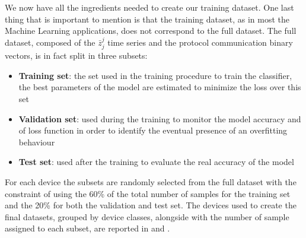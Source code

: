 We now have all the ingredients needed to create our training dataset. One last thing that is important to mention is that the training dataset, as in most the Machine Learning applications,
does not correspond to the full dataset. The full dataset, composed of the $\bar{z}_j^j$ time series and the protocol communication binary vectors, is in fact split in three subsets:
\begin{itemize}[noitemsep, nolistsep]
    \item \textbf{Training set}: the set used in the training procedure to train the classifier, the best parameters of the model are estimated to minimize the loss over this set
    \item \textbf{Validation set}: used during the training to monitor the model accuracy and of  loss function in order to identify the eventual presence of an overfitting behaviour 
    \item \textbf{Test set}: used after the training to evaluate the real accuracy of the model
\end{itemize}
For each device the subsets are randomly selected from the full dataset with the constraint of using the 60\% of the total number of samples for the training set and the 20\% for both the validation and test set.
The devices used to create the final datasets, grouped by device classes, alongside with the number of sample assigned to each subset, are reported in  and .





